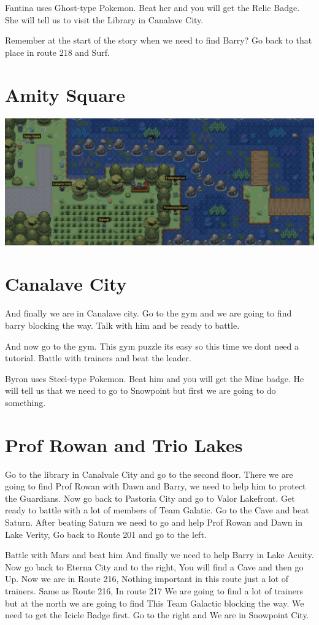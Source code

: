\documentclass[11pt]{article}
\begin{document}
Fantina uses Ghost-type Pokemon.
Beat her and you will get the Relic Badge.
She will tell us to visit the Library in Canalave City.

Remember at the start of the story when we need to find Barry?
Go back to that place in route 218 and Surf.


\section{Amity Square}
\label{sec:Amity_Square}


\includegraphics[width=\textwidth]{walkthrough/Sinnoh/Route_218}

\section{Canalave City}\label{sec:canalave-city}

And finally we are in Canalave city.
Go to the gym and we are going to find barry blocking the way.
Talk with him and be ready to battle.

And now go to the gym.
This gym puzzle its easy so this time we dont need a tutorial.
Battle with trainers and beat the leader.

Byron uses Steel-type Pokemon.
Beat him and you will get the Mine badge.
He will tell us that we need to go to Snowpoint but first we are going to do something.

\section{Prof Rowan and Trio Lakes}\label{sec:prof-rowan-and-trio-lakes}
Go to the library in Canalvale City and go to the second floor.
There we are going to find Prof Rowan with Dawn and Barry,
we need to help him to protect the Guardians.
Now go back to Pastoria City and go to Valor Lakefront.
Get ready to battle with a lot of members of Team Galatic.
Go to the Cave and beat Saturn.
After beating Saturn we need to go and help Prof Rowan and Dawn in Lake Verity, Go back to Route 201 and go to the left.

Battle with Mars and beat him
And finally we need to help Barry in Lake Acuity.
Now go back to Eterna City and to the right, You will find a Cave and then go Up.
Now we are in Route 216, Nothing important in this route just a lot of trainers.
Same as Route 216, In route 217 We are going to find a lot of trainers
but at the north we are going to find This Team Galactic blocking the way.
We need to get the Icicle Badge first.
Go to the right and We are in Snowpoint City.
\end{document}
